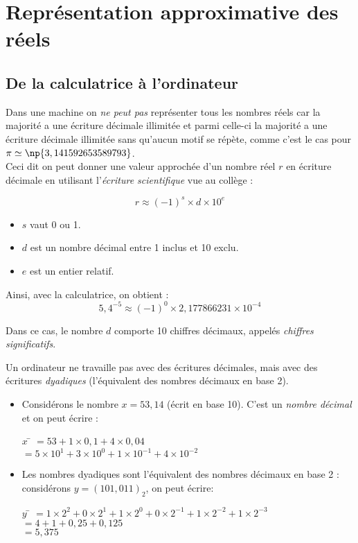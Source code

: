 \chapter{Représentation approximative des réels}


\section{De la calculatrice à l'ordinateur}
Dans une machine on \textit{ne peut pas} représenter tous les nombres réels car la majorité a une écriture décimale illimitée et parmi celle-ci la majorité a une écriture décimale illimitée sans qu'aucun motif se répète, comme c'est le cas pour $\pi\simeq\np{3,141 592 653 589 793}$.\\
Ceci dit on peut donner une valeur approchée d'un nombre réel $r$ en écriture décimale en
utilisant l'\textit{écriture scientifique} vue au collège :

$$\boxed{r\approx (-1)^s\times d\times 10^{e}}$$

\begin{itemize}
    \item   $s$ vaut 0 ou 1.
    \item   $d$ est un nombre décimal entre 1 inclus et 10 exclu.
    \item   $e$ est un entier relatif.
\end{itemize}

Ainsi, avec la calculatrice, on obtient :
$$\boxed{5,4^{-5}\approx (-1)^0\times 2,177866231\times10^{-4}}$$

Dans ce cas, le nombre $d$ comporte 10 chiffres décimaux, appelés \textit{chiffres significatifs}.

Un ordinateur ne travaille pas avec des écritures décimales, mais avec des écritures \textit{dyadiques} (l'équivalent des nombres décimaux en
base 2).
\begin{exemple}
    \begin{itemize}
        \item   Considérons le nombre $x = 53,14$ (écrit en base 10). C'est un \textit{nombre décimal} et on peut écrire :
              \begin{tabbing}
                  $x$ \=  $=53+1\times 0,1+4\times 0,04$\\
                  \>  $=5\times 10^1+3\times 10^0+1\times 10^{-1}+4\times 10^{-2}$
              \end{tabbing}
        \item   Les nombres dyadiques sont l'équivalent des nombres décimaux en base 2 : considérons $y=(101,011)_2 $, on peut écrire:
              \begin{tabbing}
                  $y$ \=  $=1\times 2^2+0\times 2^1+1\times 2^0+0\times 2^{-1}+1\times 2^{-2}+1\times 2^{-3}$\\
                  \>  $=4+1+0,25+0,125$\\
                  \>  $=5,375$
              \end{tabbing}
    \end{itemize}
\end{exemple}

